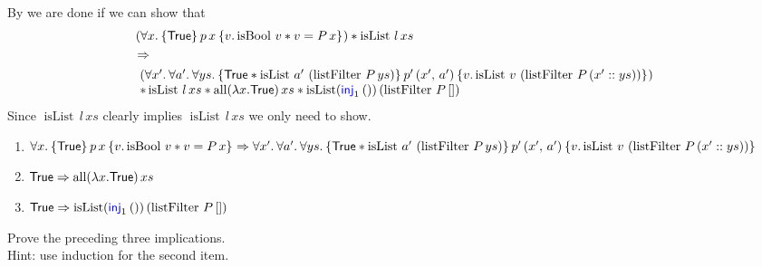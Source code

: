  By  we are done if we can show that
 \begin{align*}
 & \left( \All x. \hoare{\TRUE}{p \, x}{v. \operatorname{isBool} \, v \ast v = P \, x}\right)
\ast \operatorname{isList} \, l\, xs  \\
& \implies \\
& \begin{array}{l}
\left(  \All x'. \All a'. \All ys. \hoare {\TRUE \ast \operatorname{isList} \, a'  \, \left( \operatorname{listFilter} \, P \, ys \right)}{p' \, (x', \, a')}{v.\operatorname{isList} \, v \, \left( \operatorname{listFilter} \, P \, (x'::ys) \right)}
\right) \\
\ast \operatorname{isList} \, l\, xs \ast \operatorname{all} (\lambda x . \TRUE) \, xs \ast \operatorname{isList} (\Inj{1}()) \, (\operatorname{listFilter} \, P \, []) \end{array}
 \end{align*}
Since $\operatorname{isList} \, l\, xs$ clearly implies $\operatorname{isList} \, l\, xs$ we only need to show.
\begin{enumerate}
\item $\All x. \hoare{\TRUE}{p \, x}{v. \operatorname{isBool} \, v \ast v = P \, x} \\
\implies \All x'. \All a'. \All ys. \hoare {\TRUE \ast \operatorname{isList} \, a'  \, \left( \operatorname{listFilter} \, P \, ys \right)}{p' \, (x', \, a')}{v.\operatorname{isList} \, v \, \left( \operatorname{listFilter} \, P \, (x'::ys) \right)}$
\item $\textsf{\upshape True} \Rightarrow \operatorname{all} (\lambda x . \textsf{\upshape True}) \, xs$
\item $\textsf{\upshape True} \Rightarrow \operatorname{isList} (\textsf{\color{blue} inj}_{1}\nobreak\hskip 0.2em plus 0.1em()) \, (\operatorname{listFilter} \, P \, [])$
\end{enumerate}

\begin{exercise}
  Prove the preceding three implications.\\
  Hint: use induction for the second item.
\end{exercise}


